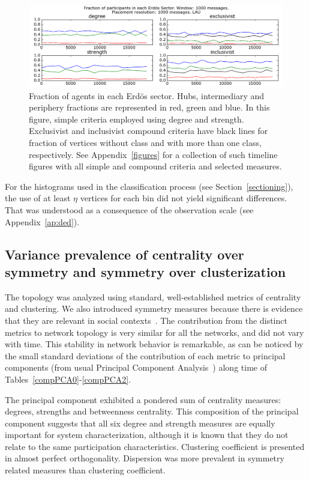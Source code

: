 \documentclass[%
 aip,
 jmp,%
 amsmath,amssymb,
 reprint,%
]{revtex4-1}
\begin{document}
\begin{figure} 
   \centering
        \includegraphics[width=\textwidth]{figs/InText-WLAU-S1000}
	\caption{Fraction of agents in each Erd\"os sector. Hubs, intermediary and periphery fractions are represented in red, green and blue. In this figure, simple criteria employed using degree and strength. Exclusivist and inclusivist compound criteria have black lines for fraction of vertices without class and with more than one class, respectively. See Appendix~\ref{figures} for a collection of such timeline figures with all simple and compound criteria and selected measures.}
    \label{tab:sectIL}
\end{figure}



For the histograms used in the classification process (see Section~\ref{sectioning}), the use of at least $\eta$ vertices for each bin did not yield significant differences.
That was understood as a consequence of the observation scale (see Appendix~\ref{ap:ded}).


\subsection{Variance prevalence of centrality over symmetry and symmetry over clusterization}\label{prevalence}
The topology was analyzed using standard, well-established metrics of centrality and clustering.
We also introduced symmetry measures because there is evidence that they are relevant in social contexts~\cite{newmanEvolving}.
The contribution from the distinct metrics to network topology is very similar for all the networks, and did not vary with time.
This stability in network behavior is remarkable, as can be noticed by the small standard deviations of the contribution of each metric to principal components (from usual Principal Component Analysis~\cite{pca}) along time of Tables~\ref{compPCA0}-\ref{compPCA2}.

The principal component exhibited a pondered sum of centrality measures: degrees, strengths and betweenness centrality.
This composition of the principal component suggests that all six degree and strength measures are equally important for system characterization, although it is known that they do not relate to the same participation characteristics.
Clustering coefficient is presented in almost perfect orthogonality.
Dispersion was more prevalent in symmetry related measures than clustering coefficient.
\end{document}
